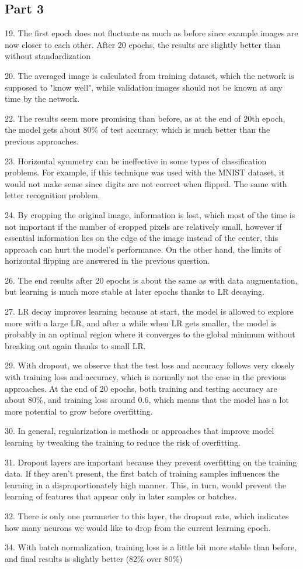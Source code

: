 \subsection{Part 3}

19. The first epoch does not fluctuate as much as before since example images are now closer to each other. After 20 epochs, the results are slightly better than without standardization

20. The averaged image is calculated from training dataset, which the network is supposed to "know well", while validation images should not be known at any time by the network.

22. The results seem more promising than before, as at the end of 20th epoch, the model gets about 80\% of test accuracy, which is much better than the previous approaches.

23. Horizontal symmetry can be ineffective in some types of classification problems. For example, if this technique was used with the MNIST dataset, it would not make sense since digits are not correct when flipped. The same with letter recognition problem.

24. By cropping the original image, information is lost, which most of the time is not important if the number of cropped pixels are relatively small, however if essential information lies on the edge of the image instead of the center, this approach can hurt the model's performance. On the other hand, the limits of horizontal flipping are answered in the previous question.

26. The end results after 20 epochs is about the same as with data augmentation, but learning is much more stable at later epochs thanks to LR decaying.

27. LR decay improves learning because at start, the model is allowed to explore more with a large LR, and after a while when LR gets smaller, the model is probably in an optimal region where it converges to the global minimum without breaking out again thanks to small LR.

29. With dropout, we observe that the test loss and accuracy follows very closely with training loss and accuracy, which is normally not the case in the previous approaches. At the end of 20 epochs, both training and testing accuracy are about 80\%, and training loss around 0.6, which means that the model has a lot more potential to grow before overfitting.

30. In general, regularization is methods or approaches that improve model learning by tweaking the training to reduce the risk of overfitting.

31. Dropout layers are important because they prevent overfitting on the training data. If they aren’t present, the first batch of training samples influences the learning in a disproportionately high manner. This, in turn, would prevent the learning of features that appear only in later samples or batches.

32. There is only one parameter to this layer, the dropout rate, which indicates how many neurons we would like to drop from the current learning epoch.

34. With batch normalization, training loss is a little bit more stable than before, and final results is slightly better (82\% over 80\%)
